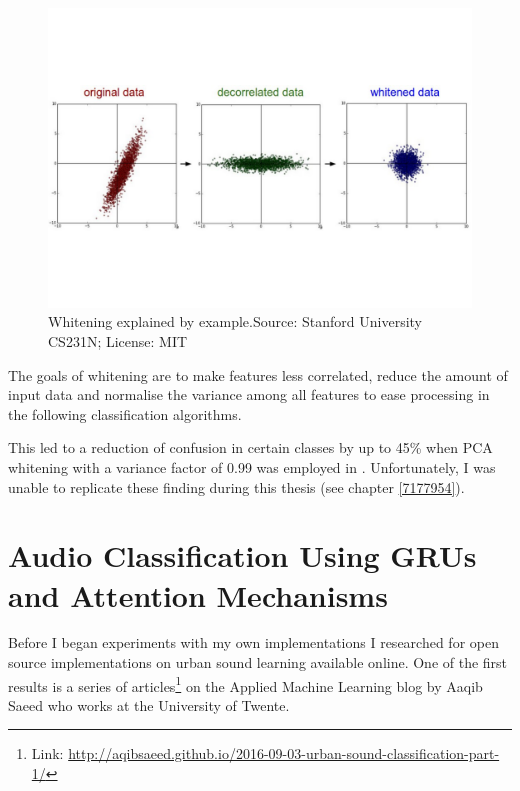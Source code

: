 \begin{figure}[h]
    \centering
	\includegraphics[width=.75\textwidth]{./images/illustrations/whitening2}
    \caption{Whitening explained by example.\newline Source: Stanford University CS231N; License: MIT}
    \label{fig:whitening}
\end{figure}


The goals of whitening are to make features less correlated, reduce the amount of input data and normalise the variance among all features to ease processing in the following classification algorithms.

This led to a reduction of confusion in certain classes by up to 45\% when PCA whitening with a variance factor of 0.99 was employed in \cite{7177954}. Unfortunately, I was unable to replicate these finding during this thesis (see chapter \ref{7177954}).













\chapter{Audio Classification Using GRUs and Attention Mechanisms}

Before I began experiments with my own implementations I researched for open source implementations on urban sound learning available online. One of the first results is a series of articles\footnote{Link: \url{http://aqibsaeed.github.io/2016-09-03-urban-sound-classification-part-1/}} on the Applied Machine Learning blog by Aaqib Saeed who works at the University of Twente.


